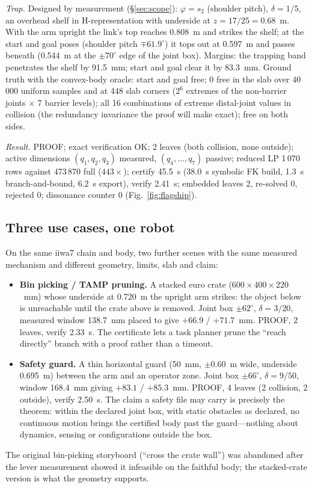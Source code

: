 \documentclass[10pt,twocolumn,letterpaper]{article}
\newcommand{\vphi}{\varphi}
\begin{document}
\emph{Trap.} Designed by measurement (\S\ref{sec:scope}): $\vphi=s_2$ (shoulder pitch), $\delta=1/5$, an overhead shelf in H-representation with underside at $z=17/25=0.68$~m. With the arm upright the link's top reaches 0.808~m and strikes the shelf; at the start and goal poses (shoulder pitch $\mp61.9^\circ$) it tops out at 0.597~m and passes beneath (0.544~m at the $\pm70^\circ$ edge of the joint box). Margins: the trapping band penetrates the shelf by 91.5~mm; start and goal clear it by 83.3~mm. Ground truth with the convex-body oracle: start and goal free; 0 free in the slab over 40\,000 uniform samples and at 448 slab corners ($2^6$ extremes of the non-barrier joints $\times$ 7 barrier levels); all 16 combinations of extreme distal-joint values in collision (the redundancy invariance the proof will make exact); free on both sides.

\emph{Result.} PROOF; exact verification OK; 2 leaves (both collision, none outside); active dimensions $(q_1,q_2,q_3)$ measured, $(q_4,\dots,q_7)$ passive; reduced LP 1\,070 rows against 473\,870 full ($443\times$); certify 45.5~s (38.0~s symbolic FK build, 1.3~s branch-and-bound, 6.2~s export), verify 2.41~s; embedded leaves 2, re-solved 0, rejected 0; dissonance counter 0 (Fig.~\ref{fig:flagship}).

\subsection{Three use cases, one robot}\label{sec:usecases}
On the same iiwa7 chain and body, two further scenes with the same measured mechanism and different geometry, limits, slab and claim:
\begin{itemize}
\item \textbf{Bin picking / TAMP pruning.} A stacked euro crate ($600\times400\times220$~mm) whose underside at 0.720~m the upright arm strikes: the object below is unreachable until the crate above is removed. Joint box $\pm62^\circ$, $\delta=3/20$, measured window 138.7~mm placed to give $+66.9$ / $+71.7$~mm. PROOF, 2 leaves, verify 2.33~s. The certificate lets a task planner prune the ``reach directly'' branch with a proof rather than a timeout.
\item \textbf{Safety guard.} A thin horizontal guard (50~mm, $\pm0.60$~m wide, underside 0.695~m) between the arm and an operator zone. Joint box $\pm66^\circ$, $\delta=9/50$, window 168.4~mm giving $+83.1$ / $+85.3$~mm. PROOF, 4 leaves (2 collision, 2 outside), verify 2.50~s. The claim a safety file may carry is precisely the theorem: within the declared joint box, with static obstacles as declared, no continuous motion brings the certified body past the guard---nothing about dynamics, sensing or configurations outside the box.
\end{itemize}
The original bin-picking storyboard (``cross the crate wall'') was abandoned after the lever measurement showed it infeasible on the faithful body; the stacked-crate version is what the geometry supports.
\end{document}
